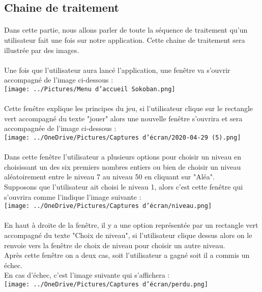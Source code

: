 \documentclass{article}
\begin{document}
\subsection{Chaine de traitement}
\paragraph{}Dans cette partie, nous allons parler de toute la séquence de traitement qu'un utilisateur fait une fois sur notre application. Cette chaine de traitement sera illustrée par des images. \\
\\Une fois que l'utilisateur aura lancé l'application, une fenêtre va s'ouvrir accompagné de l'image ci-dessous : \\
\texttt{[image: ../Pictures/Menu d'accueil Sokoban.png]} 
\\
\\
Cette fenêtre explique les principes du jeu, si l'utilisateur clique sur le rectangle vert accompagné du texte "jouer" alors une nouvelle fenêtre s'ouvrira et sera accompagnée de l'image ci-dessous : \\
\texttt{[image: ../OneDrive/Pictures/Captures d’écran/2020-04-29 (5).png]} 
\\ 
\\
Dans cette fenêtre l'utilisateur a plusieurs options pour choisir un niveau en choisissant un des six premiers nombres entiers ou bien de choisir un niveau aléatoirement entre le niveau 7 au niveau 50 en cliquant sur "Aléa".\\
Supposons que l'utilisateur ait choisi le niveau 1, alors c'est cette fenêtre qui s'ouvrira comme l'indique l'image suivante :\\
\texttt{[image: ../OneDrive/Pictures/Captures d’écran/niveau.png]} 
\\ 
\\
En haut à droite de la fenêtre, il y a une option représentée par un rectangle vert accompagné du texte "Choix de niveau", si l'utilisateur clique dessus alors on le renvoie vers la fenêtre de choix de niveau pour choisir un autre niveau.\\
Après cette fenêtre on a deux cas, soit l'utilisateur a gagné soit il a commis un échec.\\
En cas d'échec, c'est l'image suivante qui s'affichera : \\
\texttt{[image: ../OneDrive/Pictures/Captures d’écran/perdu.png]} 
\\ 
\end{document}
